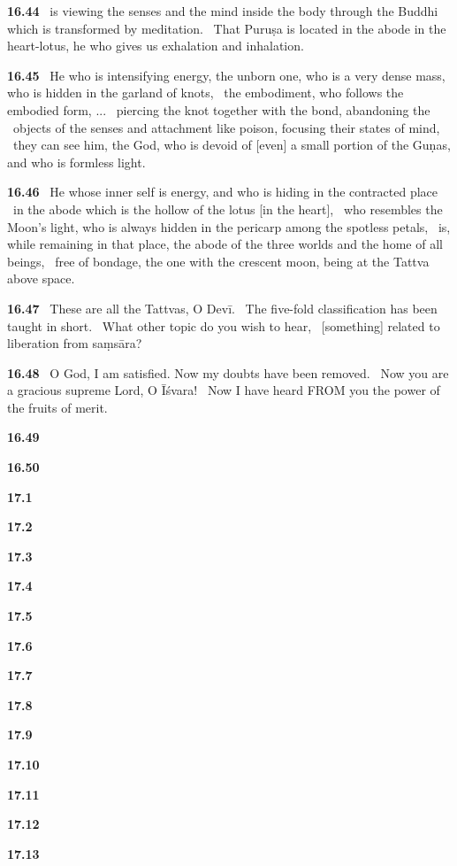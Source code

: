 \documentclass{article}
\begin{document}
\textbf{16.44}%
\ is viewing the senses and the mind inside the body through the Buddhi which is transformed by meditation.%
\ That Puruṣa is located in the abode in the heart-lotus, he who gives us exhalation and inhalation.%


\textbf{16.45}%
\ He who is intensifying energy, the unborn one, who is a very dense mass, who is hidden in the garland of knots,%
\ the embodiment, who follows the embodied form, ...%
\ piercing the knot together with the bond, abandoning the%
\                 objects of the senses and attachment like poison, focusing their states of mind,%
\ they can see him, the God, who is devoid of [even] a small portion of the Guṇas, and who is formless light.%


\textbf{16.46}%
\ He whose inner self is energy, and who is hiding in the contracted place%
\                         in the abode which is the hollow of the lotus [in the heart],%
\ who resembles the Moon's light, who is always hidden in the pericarp among the spotless petals,%
\ is, while remaining in that place, the abode of the three worlds and the home of all beings,%
\ free of bondage, the one with the crescent moon, being at the Tattva above space.%


\textbf{16.47}%
\ These are all the Tattvas, O Devī.%
\ The five-fold classification has been taught in short.%
\ What other topic do you wish to hear,%
\ [something] related to liberation from saṃsāra?%


\textbf{16.48}%
\ O God, I am satisfied. Now my doubts have been removed.%
\ Now you are a gracious supreme Lord, O Īśvara!%
\ Now I have heard FROM you the power of the fruits of merit.%


\textbf{16.49}%


\textbf{16.50}%


\textbf{17.1}%


\textbf{17.2}%


\textbf{17.3}%


\textbf{17.4}%


\textbf{17.5}%


\textbf{17.6}%


\textbf{17.7}%


\textbf{17.8}%


\textbf{17.9}%


\textbf{17.10}%


\textbf{17.11}%


\textbf{17.12}%


\textbf{17.13}%
\end{document}

